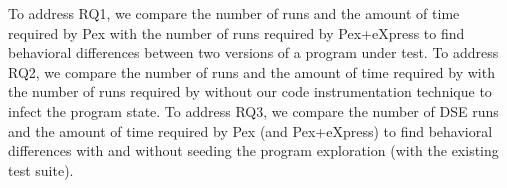 To address RQ1, we compare the number of runs and the amount of time required by Pex with the number of runs required by Pex+eXpress to find behavioral differences between two versions of a program under test.
To address RQ2, we compare the number of runs and the amount of time required by  
with the number of runs required by  without our code instrumentation technique to infect the program state.
To address RQ3, we compare the number of DSE runs and the amount of time required by Pex (and Pex+eXpress) to find behavioral differences with and without seeding the program exploration (with the existing test suite).


